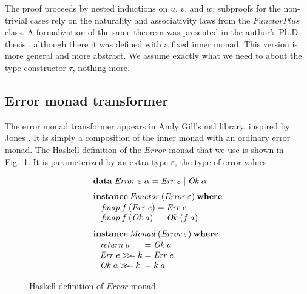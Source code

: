 \documentclass{sigplanconf}
\newcommand{\hsbind}{\mathbin{>\mkern-6mu>\mkern-6.5mu=}}
\newcommand{\kwd}[1]{\mathbf{#1}}
\newcommand{\hsc}[1]{\ensuremath{\mathit{#1}}}
\newcommand{\fmap}{\,\hsc{fmap}} %
\newcommand{\tA}{\alpha}
\newcommand{\tE}{\varepsilon}
\newcommand{\tT}{\tau}
\theoremstyle{definition}
\begin{document}
The proof proceeds by nested inductions on $u$, $v$, and $w$; subproofs for the non-trivial cases rely on the naturality and associativity laws from the \hsc{FunctorPlus} class. A formalization of the same theorem was presented in the author's Ph.D thesis \cite{holcf11}, although there it was defined with a fixed inner monad. This version is more general and more abstract. We assume exactly what we need to about the type constructor $\tT$, nothing more.

\subsection{Error monad transformer}

The error monad transformer appears in Andy Gill's mtl library, inspired by Jones \cite{Jones1995}. It is simply a composition of the inner monad with an ordinary error monad. The Haskell definition of the \hsc{Error} monad that we use is shown in Fig.~\ref{fig:error}. It is parameterized by an extra type $\tE$, the type of error values.

\begin{figure}
\begin{align*}
  & \kwd{data}\;\hsc{Error}\;\tE\;\tA =
  \hsc{Err}\;\tE \mid \hsc{Ok}\;\tA
  \\[\jot]
  & \kwd{instance}\:\hsc{Functor}\:(\hsc{Error}\:\tE)\:\kwd{where}
  \\[-\jot]
  & \hspace{8pt}
  \begin{alignedat}{2}
    & \fmap\:f\:(\hsc{Err}\;e) &&= \hsc{Err}\;e \\[-\jot]
    & \fmap\:f\:(\hsc{Ok}\;a) &&= \hsc{Ok}\;(f\:a)
  \end{alignedat}
  \\[\jot]
  & \kwd{instance}\:\hsc{Monad}\:(\hsc{Error}\:\tE)\:\kwd{where}
  \\[-\jot]
  & \hspace{8pt}
  \begin{alignedat}{2}
    & \hsc{return}\;a &&= \hsc{Ok}\;a \\[-\jot]
    & \hsc{Err}\;e \hsbind k &&= \hsc{Err}\;e \\[-\jot]
    & \hsc{Ok}\;a \hsbind k &&= k\;a
  \end{alignedat}
\end{align*}
\caption{Haskell definition of \hsc{Error} monad}
\label{fig:error}
\end{figure}
\end{document}
